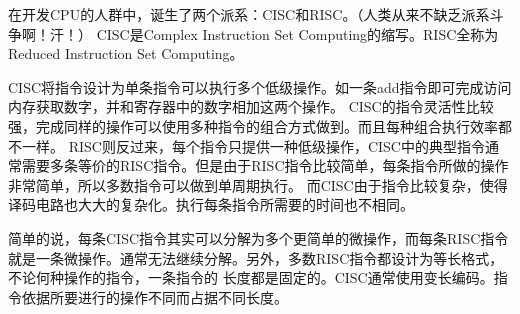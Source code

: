 在开发CPU的人群中，诞生了两个派系：CISC和RISC。（人类从来不缺乏派系斗争啊！汗！）
CISC是{}Complex Instruction Set Computing{}的缩写。RISC全称为{}Reduced Instruction Set Computing{}。

CISC{}将指令设计为单条指令可以执行多个低级操作。如一条add指令即可完成访问内存获取数字，并和寄存器中的数字相加这两个操作。
CISC的指令灵活性比较强，完成同样的操作可以使用多种指令的组合方式做到。而且每种组合执行效率都不一样。
RISC则反过来，每个指令只提供一种低级操作，CISC中的典型指令通常需要多条等价的RISC指令。但是由于RISC指令比较简单，每条指令所做的操作非常简单，所以多数指令可以做到单周期执行。
而CISC由于指令比较复杂，使得译码电路也大大的复杂化。执行每条指令所需要的时间也不相同。

简单的说，每条CISC指令其实可以分解为多个更简单的微操作，而每条RISC指令就是一条微操作。通常无法继续分解。另外，多数RISC指令都设计为等长格式，不论何种操作的指令，一条指令的
长度都是固定的。CISC通常使用变长编码。指令依据所要进行的操作不同而占据不同长度。

